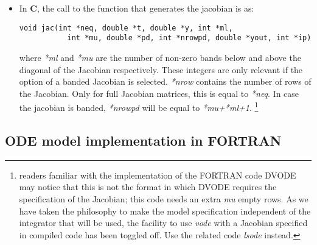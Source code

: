 \documentclass[english]{article}
\newcommand{\FOR}{\textbf{\textsf{FORTRAN}}\xspace}
\newcommand{\C}{\textbf{\textsf{C}}\xspace}
\begin{document}
\begin{itemize}
Note that, in function \emph{derivs}, we start by checking whether enough room is allocated for the output variables ("if (ip[0] <1)"),
else an error is passed to R and the integration is stopped.
\item In \C, the call to the function that generates the jacobian is as:
\begin{verbatim}
void jac(int *neq, double *t, double *y, int *ml,
           int *mu, double *pd, int *nrowpd, double *yout, int *ip)
\end{verbatim}
where \emph{*ml} and \emph{*mu} are the number of non-zero bands below and above
the diagonal of the Jacobian respectively. These integers are only relevant if the option of a
banded Jacobian is selected. \emph{*nrow} contains the number of rows of the Jacobian.
Only for full Jacobian matrices, this is equal to \emph{*neq}. In case the
jacobian is banded, \emph{*nrowpd} will be equal to \emph{*mu+*ml+1}.
\footnote{readers familiar with the implementation of the FORTRAN code DVODE may notice that
this is not the format in which DVODE requires the specification of the Jacobian;
this code needs an extra \emph{mu} empty rows. As we have taken the philosophy to make
the model specification independent of the integrator that will be used, the facility
to use \emph{vode} with a Jacobian specified in compiled code has been toggled off.
Use the related code \emph{lsode} instead.}
\end{itemize}



\subsection{ODE model implementation in \FOR}
\end{document}
